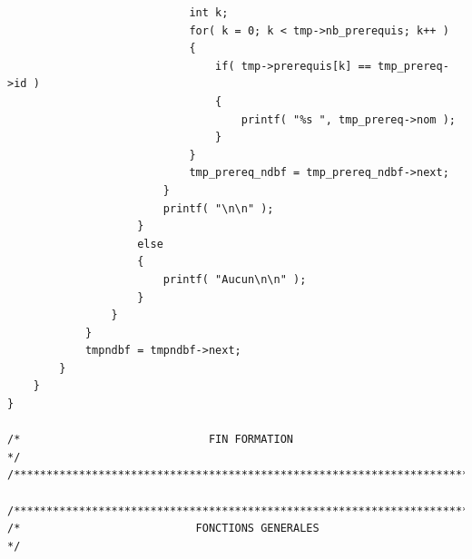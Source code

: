 \documentclass[11pt]{article}
\begin{document}
\begin{lstlisting}
                            int k;
                            for( k = 0; k < tmp->nb_prerequis; k++ )
                            {
                                if( tmp->prerequis[k] == tmp_prereq->id )
                                {
                                    printf( "%s ", tmp_prereq->nom );
                                }
                            }
                            tmp_prereq_ndbf = tmp_prereq_ndbf->next;
                        }
                        printf( "\n\n" );
                    }
                    else
                    {
                        printf( "Aucun\n\n" );
                    }
                }
            }
            tmpndbf = tmpndbf->next;
        }
    }
}

/*                             FIN FORMATION                                 */
/*****************************************************************************/

/*****************************************************************************/
/*                           FONCTIONS GENERALES                             */


\end{lstlisting}
\end{document}
